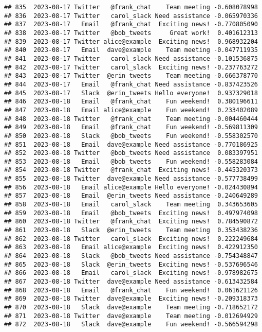 \documentclass[
]{article}
\begin{document}
\begin{verbatim}
## 835  2023-08-17 Twitter   @frank_chat    Team meeting -0.608078998
## 836  2023-08-17 Twitter   carol_slack Need assistance -0.065970336
## 837  2023-08-17   Email   @frank_chat  Exciting news! -0.770805090
## 838  2023-08-17 Twitter   @bob_tweets     Great work!  0.401612313
## 839  2023-08-17 Twitter alice@example  Exciting news!  0.968932204
## 840  2023-08-17   Email  dave@example    Team meeting -0.047711935
## 841  2023-08-17 Twitter   carol_slack Need assistance -0.101536875
## 842  2023-08-17 Twitter   carol_slack  Exciting news! -0.237763272
## 843  2023-08-17 Twitter  @erin_tweets    Team meeting -0.666378770
## 844  2023-08-17   Email   @frank_chat Need assistance -0.837423526
## 845  2023-08-17   Slack  @erin_tweets Hello everyone!  0.937329018
## 846  2023-08-18   Email   @frank_chat    Fun weekend!  0.380196611
## 847  2023-08-18   Email alice@example    Fun weekend!  0.233402089
## 848  2023-08-18 Twitter   @frank_chat    Team meeting -0.004460444
## 849  2023-08-18   Email   @frank_chat    Fun weekend! -0.569811309
## 850  2023-08-18   Slack   @bob_tweets    Fun weekend! -0.558302570
## 851  2023-08-18   Email  dave@example Need assistance -0.770186925
## 852  2023-08-18 Twitter   @bob_tweets Need assistance  0.083397951
## 853  2023-08-18   Email   @bob_tweets    Fun weekend! -0.558283084
## 854  2023-08-18 Twitter   @frank_chat  Exciting news! -0.445320373
## 855  2023-08-18 Twitter  dave@example Need assistance -0.577738499
## 856  2023-08-18   Email alice@example Hello everyone! -0.024430894
## 857  2023-08-18   Email  @erin_tweets Need assistance -0.240649289
## 858  2023-08-18   Email   carol_slack    Team meeting  0.343653605
## 859  2023-08-18   Email   @bob_tweets  Exciting news!  0.497974098
## 860  2023-08-18 Twitter   @frank_chat  Exciting news!  0.784590872
## 861  2023-08-18   Slack  @erin_tweets    Team meeting  0.353438236
## 862  2023-08-18 Twitter   carol_slack  Exciting news!  0.222249684
## 863  2023-08-18   Email alice@example  Exciting news!  0.422912350
## 864  2023-08-18   Slack   @bob_tweets Need assistance -0.754348847
## 865  2023-08-18   Slack  @erin_tweets  Exciting news! -0.537696546
## 866  2023-08-18   Email   carol_slack  Exciting news! -0.978982675
## 867  2023-08-18 Twitter  dave@example Need assistance -0.613432584
## 868  2023-08-18   Email   @frank_chat    Fun weekend!  0.061621126
## 869  2023-08-18 Twitter  dave@example  Exciting news! -0.209318373
## 870  2023-08-18   Slack  dave@example    Team meeting -0.718652172
## 871  2023-08-18 Twitter  dave@example    Team meeting -0.012694929
## 872  2023-08-18   Slack  dave@example    Fun weekend! -0.566594298

\end{verbatim}
\end{document}
